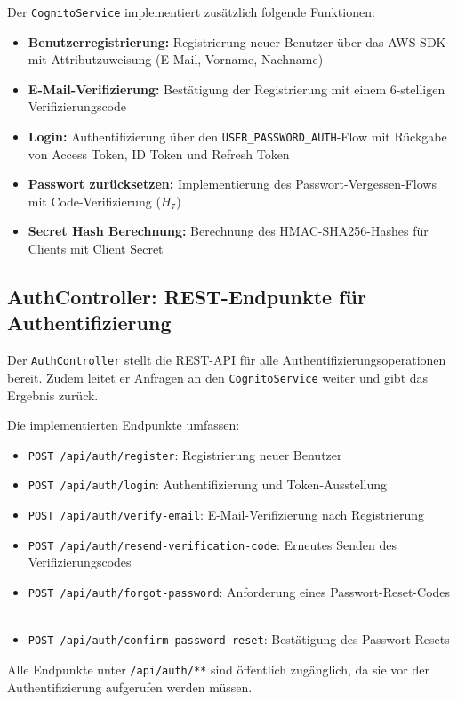 Der \texttt{CognitoService} implementiert zusätzlich folgende Funktionen:
\begin{itemize}
    \item \textbf{Benutzerregistrierung:} Registrierung neuer Benutzer über das \ac{AWS} \ac{SDK} mit Attributzuweisung (E-Mail, Vorname, Nachname)
    \item \textbf{E-Mail-Verifizierung:} Bestätigung der Registrierung mit einem 6-stelligen Verifizierungscode
    \item \textbf{Login:} Authentifizierung über den \texttt{USER\_PASSWORD\_AUTH}-Flow mit Rückgabe von Access Token, ID Token und Refresh Token
    \item \textbf{Passwort zurücksetzen:} Implementierung des Passwort-Vergessen-Flows mit Code-Verifizierung ($H_7$)
    \item \textbf{Secret Hash Berechnung:} Berechnung des HMAC-SHA256-Hashes für Clients mit Client Secret
\end{itemize}

\subsection{AuthController: REST-Endpunkte für Authentifizierung}

Der \texttt{AuthController} stellt die REST-\ac{API} für alle Authentifizierungsoperationen bereit. Zudem leitet er Anfragen an den \texttt{CognitoService} weiter und gibt das Ergebnis zurück.

Die implementierten Endpunkte umfassen:
\begin{itemize}
    \item \texttt{POST /api/auth/register}: Registrierung neuer Benutzer
    \item \texttt{POST /api/auth/login}: Authentifizierung und Token-Ausstellung
    \item \texttt{POST /api/auth/verify-email}: E-Mail-Verifizierung nach Registrierung
    \item \texttt{POST /api/auth/resend-verification-code}: Erneutes Senden des Verifizierungscodes
    \item \texttt{POST /api/auth/forgot-password}: Anforderung eines Passwort-Reset-Codes
    \item \texttt{POST /api/auth/confirm-password-reset}: Bestätigung des Passwort-Resets
\end{itemize}

Alle Endpunkte unter \texttt{/api/auth/**} sind öffentlich zugänglich, da sie vor der Authentifizierung aufgerufen werden müssen.

